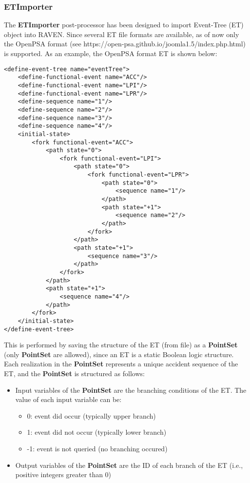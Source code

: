 
\subsubsection{ETImporter}
\label{ETImporterPP}
The \textbf{ETImporter} post-processor has been designed to import Event-Tree (ET) object into
RAVEN. Since several ET file formats are available, as of now only the OpenPSA format
(see https://open-psa.github.io/joomla1.5/index.php.html) is supported. As an example,
the OpenPSA format ET is shown below:

\begin{lstlisting}[style=XML,morekeywords={anAttribute},caption=ET in OpenPSA format., label=lst:ETModel]
<define-event-tree name="eventTree">
    <define-functional-event name="ACC"/>
    <define-functional-event name="LPI"/>
    <define-functional-event name="LPR"/>
    <define-sequence name="1"/>
    <define-sequence name="2"/>
    <define-sequence name="3"/>
    <define-sequence name="4"/>
    <initial-state>
        <fork functional-event="ACC">
            <path state="0">
                <fork functional-event="LPI">
                    <path state="0">
                        <fork functional-event="LPR">
                            <path state="0">
                                <sequence name="1"/>
                            </path>
                            <path state="+1">
                                <sequence name="2"/>
                            </path>
                        </fork>
                    </path>
                    <path state="+1">
                        <sequence name="3"/>
                    </path>
                </fork>
            </path>
            <path state="+1">
                <sequence name="4"/>
            </path>
        </fork>
    </initial-state>
</define-event-tree>
\end{lstlisting}

This is performed by saving the structure of the ET (from file) as a \textbf{PointSet}
(only \textbf{PointSet} are allowed), since an ET is a static Boolean logic structure. Each realization in the
\textbf{PointSet} represents a unique accident sequence of the ET, and the \textbf{PointSet} is structured as follows:
\begin{itemize}
  \item Input variables of the \textbf{PointSet} are the branching conditions of the ET. The value of each input variable can be:
  \begin{itemize}
    \item  0: event did occur (typically upper branch)
    \item  1: event did not occur (typically lower branch)
    \item -1: event is not queried (no branching occured)
  \end{itemize}
  \item Output variables of the \textbf{PointSet} are the ID of each branch of the ET (i.e., positive integers greater than 0)
\end{itemize}

